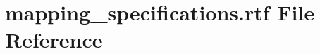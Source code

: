 \hypertarget{mapping__specifications_8rtf}{}\section{mapping\+\_\+specifications.\+rtf File Reference}
\label{mapping__specifications_8rtf}
